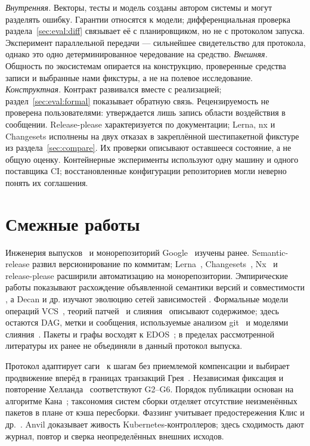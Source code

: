 \documentclass[sigconf,nonacm]{acmart}
\theoremstyle{acmplain}
\theoremstyle{acmdefinition}
\theoremstyle{acmplain}
\newcommand{\G}[1]{G#1}
\begin{document}
\emph{Внутренняя.} Векторы, тесты и модель созданы автором системы и могут
разделять ошибку. Гарантии относятся к модели; дифференциальная проверка
раздела~\ref{sec:eval:diff} связывает её с планировщиком, но не с протоколом
запуска. Эксперимент параллельной передачи --- сильнейшее свидетельство для
протокола, однако это одно детерминированное чередование на средство.
\emph{Внешняя.} Общность по экосистемам опирается на конструкцию, проверенные
средства записи и выбранные нами фикстуры, а не на полевое исследование.
\emph{Конструктная.} Контракт развивался вместе с реализацией;
раздел~\ref{sec:eval:formal} показывает обратную связь. Рецензируемость не
проверена пользователями: утверждается лишь запись области воздействия в
сообщении. Release-please характеризуется по документации; Lerna, nx и
Changesets исполнены на двух отказах в закреплённой шестипакетной фикстуре из
раздела~\ref{sec:compare}. Их проверки описывают оставшееся состояние, а не
общую оценку. Контейнерные эксперименты используют одну машину и одного
поставщика CI; восстановленные конфигурации репозиториев могли неверно понять
их соглашения.

\section{Смежные работы}
\label{sec:related}

Инженерия выпусков~\cite{adams} и монорепозиторий Google~\cite{potvin}
изучены ранее. Semantic-release
\cite{semanticrelease} развил версионирование по коммитам; Lerna~\cite{lerna},
Changesets~\cite{changesets}, Nx~\cite{nx} и release-please
\cite{releaseplease} расширили автоматизацию на монорепозитории. Эмпирические
работы показывают расхождение объявленной семантики версий и совместимости
\cite{raemaekers,bogart}, а Decan и др. изучают эволюцию сетей зависимостей
\cite{decan}. Формальные модели операций VCS~\cite{swierstraloh}, теорий
патчей~\cite{hpt} и слияния~\cite{mimram} описывают содержимое; здесь остаются
DAG, метки и сообщения, используемые анализом git~\cite{birdgit} и моделями
слияния~\cite{mrdt}. Пакеты и графы восходят к EDOS~\cite{edos}; в пределах
рассмотренной литературы их ранее не объединяли в данный протокол выпуска.

Протокол адаптирует саги~\cite{sagas} к шагам без приемлемой компенсации и
выбирает продвижение вперёд в границах транзакций Грея~\cite{gray}.
Независимая фиксация и повторение Хелланда~\cite{helland07,helland12}
соответствуют \G{2}--\G{6}. Порядок публикации
основан на алгоритме Кана~\cite{kahn}; таксономия систем сборки
\cite{mokhov} отделяет отсутствие неизменённых пакетов в плане от кэша
пересборки. Фаззинг учитывает предостережения Клис и др.~\cite{klees}. Anvil
\cite{anvil} доказывает живость Kubernetes-контроллеров; здесь сходимость дают
журнал, повтор и сверка неопределённых внешних исходов.
\end{document}
